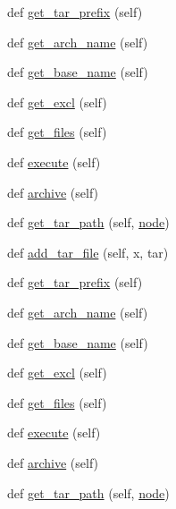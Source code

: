 \begin{DoxyCompactItemize}
def \hyperlink{classwaflib_1_1_scripting_1_1_dist_a20b28677d28b516c05e8af1b20c65c67}{get\+\_\+tar\+\_\+prefix} (self)
\item 
def \hyperlink{classwaflib_1_1_scripting_1_1_dist_a98d05f8f6a2fc8f33814fbc654135724}{get\+\_\+arch\+\_\+name} (self)
\item 
def \hyperlink{classwaflib_1_1_scripting_1_1_dist_aba6bf457f948f8ac80d1de9f47a59ac2}{get\+\_\+base\+\_\+name} (self)
\item 
def \hyperlink{classwaflib_1_1_scripting_1_1_dist_a1280a2469cad7d9fa88c3afcbbfa920d}{get\+\_\+excl} (self)
\item 
def \hyperlink{classwaflib_1_1_scripting_1_1_dist_afe6d98e6e39822f250f9302b07c0afab}{get\+\_\+files} (self)
\item 
def \hyperlink{classwaflib_1_1_scripting_1_1_dist_a1ed5e146ed66af4d02c205dbb428f49f}{execute} (self)
\item 
def \hyperlink{classwaflib_1_1_scripting_1_1_dist_aaaa979f347096bd91a2feb553bbacf35}{archive} (self)
\item 
def \hyperlink{classwaflib_1_1_scripting_1_1_dist_a64707e5623688ede0aa955afe3640b98}{get\+\_\+tar\+\_\+path} (self, \hyperlink{structnode}{node})
\item 
def \hyperlink{classwaflib_1_1_scripting_1_1_dist_a2afba826ee8f5b522e6ce822f9878755}{add\+\_\+tar\+\_\+file} (self, x, tar)
\item 
def \hyperlink{classwaflib_1_1_scripting_1_1_dist_a20b28677d28b516c05e8af1b20c65c67}{get\+\_\+tar\+\_\+prefix} (self)
\item 
def \hyperlink{classwaflib_1_1_scripting_1_1_dist_a98d05f8f6a2fc8f33814fbc654135724}{get\+\_\+arch\+\_\+name} (self)
\item 
def \hyperlink{classwaflib_1_1_scripting_1_1_dist_aba6bf457f948f8ac80d1de9f47a59ac2}{get\+\_\+base\+\_\+name} (self)
\item 
def \hyperlink{classwaflib_1_1_scripting_1_1_dist_a1280a2469cad7d9fa88c3afcbbfa920d}{get\+\_\+excl} (self)
\item 
def \hyperlink{classwaflib_1_1_scripting_1_1_dist_afe6d98e6e39822f250f9302b07c0afab}{get\+\_\+files} (self)
\item 
def \hyperlink{classwaflib_1_1_scripting_1_1_dist_a1ed5e146ed66af4d02c205dbb428f49f}{execute} (self)
\item 
def \hyperlink{classwaflib_1_1_scripting_1_1_dist_aaaa979f347096bd91a2feb553bbacf35}{archive} (self)
\item 
def \hyperlink{classwaflib_1_1_scripting_1_1_dist_a64707e5623688ede0aa955afe3640b98}{get\+\_\+tar\+\_\+path} (self, \hyperlink{structnode}{node})

\end{DoxyCompactItemize}
